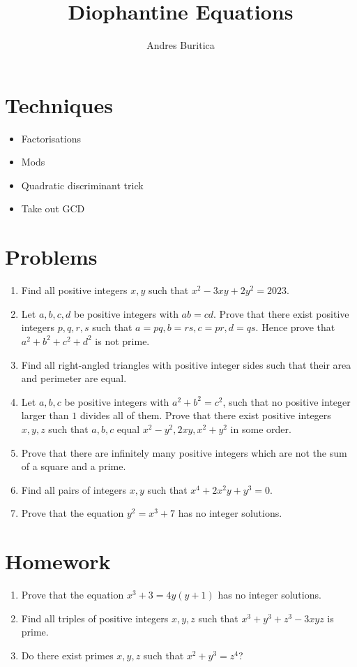 \documentclass{article}
\title{Diophantine Equations}
\author{Andres Buritica}
\date{}
\begin{document}
\maketitle
\section{Techniques}
\begin{itemize}
  \item Factorisations
  \item Mods
  \item Quadratic discriminant trick
  \item Take out GCD
\end{itemize}
\section{Problems}
\begin{enumerate}
  \item Find all positive integers $x, y$ such that $x^2-3xy+2y^2=2023$.
  \item Let $a, b, c, d$ be positive integers with $ab=cd$. Prove that there
    exist positive integers $p, q, r, s$ such that $a=pq, b=rs, c=pr, d=qs$.
    Hence prove that $a^2+b^2+c^2+d^2$ is not prime.
  \item Find all right-angled triangles with positive integer sides such that
    their area and perimeter are equal.
  \item Let $a, b, c$ be positive integers with $a^2+b^2=c^2$, such that no
    positive integer larger than $1$ divides all of them. Prove that there exist
    positive integers $x, y, z$ such that $a, b, c$ equal $x^2-y^2, 2xy,
    x^2+y^2$ in some order.
  \item Prove that there are infinitely many positive integers which are not the
    sum of a square and a prime.
  \item Find all pairs of integers $x,y$ such that $x^4+2x^2y+y^3=0$.
  \item Prove that the equation $y^2=x^3+7$ has no integer solutions.
\end{enumerate}
\newpage
\section{Homework}
  \begin{enumerate}
    \item Prove that the equation $x^3+3=4y(y+1)$ has no integer solutions.
    \item Find all triples of positive integers $x, y, z$ such that
      $x^3+y^3+z^3-3xyz$ is prime.
    \item Do there exist primes $x,y,z$ such that $x^2+y^3=z^4$?
  \end{enumerate}
\end{document}

